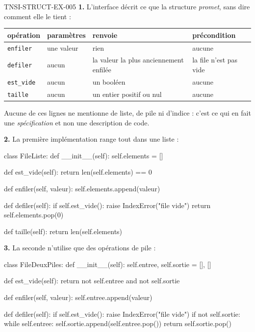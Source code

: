 \begin{corrige}{TNSI-STRUCT-EX-005}
\textbf{1.} L'interface décrit ce que la structure \emph{promet}, sans dire
comment elle le tient :

\begin{center}
\begin{tabular}{llll}
\hline
opération & paramètres & renvoie & précondition \\
\hline
\lstinline{enfiler} & une valeur & rien & aucune \\
\lstinline{defiler} & aucun & la valeur la plus anciennement enfilée & la file n'est pas vide \\
\lstinline{est_vide} & aucun & un booléen & aucune \\
\lstinline{taille} & aucun & un entier positif ou nul & aucune \\
\hline
\end{tabular}
\end{center}

Aucune de ces lignes ne mentionne de liste, de pile ni d'indice : c'est ce qui
en fait une \emph{spécification} et non une description de code.

\textbf{2.} La première implémentation range tout dans une liste :
\begin{python}
class FileListe:
    def __init__(self):
        self.elements = []

    def est_vide(self):
        return len(self.elements) == 0

    def enfiler(self, valeur):
        self.elements.append(valeur)

    def defiler(self):
        if self.est_vide():
            raise IndexError("file vide")
        return self.elements.pop(0)

    def taille(self):
        return len(self.elements)
\end{python}

\textbf{3.} La seconde n'utilise que des opérations de pile :
\begin{python}
class FileDeuxPiles:
    def __init__(self):
        self.entree, self.sortie = [], []

    def est_vide(self):
        return not self.entree and not self.sortie

    def enfiler(self, valeur):
        self.entree.append(valeur)

    def defiler(self):
        if self.est_vide():
            raise IndexError("file vide")
        if not self.sortie:
            while self.entree:
                self.sortie.append(self.entree.pop())
        return self.sortie.pop()


\end{python}
\end{corrige}
